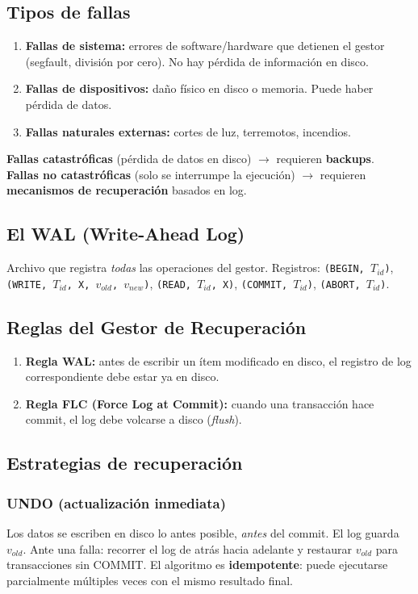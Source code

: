 \documentclass[12pt, a4paper]{article}
\begin{document}
\subsection{Tipos de fallas}
\begin{enumerate}
  \item \textbf{Fallas de sistema:} errores de software/hardware que detienen el gestor (segfault, división por cero). No hay pérdida de información en disco.
  \item \textbf{Fallas de dispositivos:} daño físico en disco o memoria. Puede haber pérdida de datos.
  \item \textbf{Fallas naturales externas:} cortes de luz, terremotos, incendios.
\end{enumerate}

\textbf{Fallas catastróficas} (pérdida de datos en disco) $\rightarrow$ requieren \textbf{backups}.\\
\textbf{Fallas no catastróficas} (solo se interrumpe la ejecución) $\rightarrow$ requieren \textbf{mecanismos de recuperación} basados en log.

\subsection{El WAL (Write-Ahead Log)}
Archivo que registra \textit{todas} las operaciones del gestor.
Registros: \texttt{(BEGIN, $T_{id}$)}, \texttt{(WRITE, $T_{id}$, X, $v_{old}$, $v_{new}$)}, \texttt{(READ, $T_{id}$, X)}, \texttt{(COMMIT, $T_{id}$)}, \texttt{(ABORT, $T_{id}$)}.

\subsection{Reglas del Gestor de Recuperación}
\begin{enumerate}
  \item \textbf{Regla WAL:} antes de escribir un ítem modificado en disco, el registro de log correspondiente debe estar ya en disco.
  \item \textbf{Regla FLC (Force Log at Commit):} cuando una transacción hace commit, el log debe volcarse a disco (\textit{flush}).
\end{enumerate}

\subsection{Estrategias de recuperación}

\subsubsection{UNDO (actualización inmediata)}
Los datos se escriben en disco lo antes posible, \textit{antes} del commit. El log guarda $v_{old}$.
Ante una falla: recorrer el log de atrás hacia adelante y restaurar $v_{old}$ para transacciones sin COMMIT.
El algoritmo es \textbf{idempotente}: puede ejecutarse parcialmente múltiples veces con el mismo resultado final.
\end{document}

